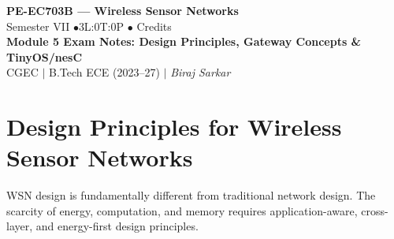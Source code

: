 \documentclass[12pt,a4paper]{article}
\begin{document}

\begin{center}
  {\LARGE\bfseries\color{myred} PE-EC703B --- Wireless Sensor Networks}\\[5pt]
  {\normalsize\color{mydark} Semester VII \quad$\bullet$\quad 3L:0T:0P \quad$\bullet$ Credits}\\[3pt]
  {\normalsize\color{myteal}\textbf{Module 5 Exam Notes: Design Principles, Gateway Concepts \& TinyOS/nesC}}\\[3pt]
  {\small\color{mydark} CGEC \;$|$\; B.Tech ECE (2023--27) \;$|$\; \textit{Biraj Sarkar}}
\end{center}
\vspace{2pt}
\noindent{\color{myred}\rule{\linewidth}{1.5pt}}
\vspace{2pt}

\hypersetup{linkcolor=mydark}
\tableofcontents
\hypersetup{linkcolor=myteal}
\newpage

\section{Design Principles for Wireless Sensor Networks}

WSN design is fundamentally different from traditional network design. The scarcity of energy, computation, and memory requires application-aware, cross-layer, and energy-first design principles.
\end{document}
